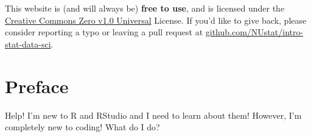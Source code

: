 \documentclass[
  letterpaper,
  DIV=11,
  numbers=noendperiod]{scrreprt}
\theoremstyle{definition}
\theoremstyle{remark}
\begin{document}
This website is (and will always be) \textbf{free to use}, and is
licensed under the
\href{https://creativecommons.org/publicdomain/zero/1.0/}{Creative
Commons Zero v1.0 Universal} License. If you'd like to give back, please
consider reporting a typo or leaving a pull request at
\href{https://github.com/NUstat/intro-stat-data-sci}{github.com/NUstat/intro-stat-data-sci}.


\hypertarget{preface}{%
\chapter*{Preface}\label{preface}}


Help! I'm new to R and RStudio and I need to learn about them! However,
I'm completely new to coding! What do I do?

\begin{figure}

\begin{minipage}[t]{0.31\linewidth}

{\centering 


\caption{}

}

\end{minipage}%
%
\begin{minipage}[t]{0.69\linewidth}

{\centering 


\caption{}

}

\end{minipage}%

\end{figure}
\end{document}
